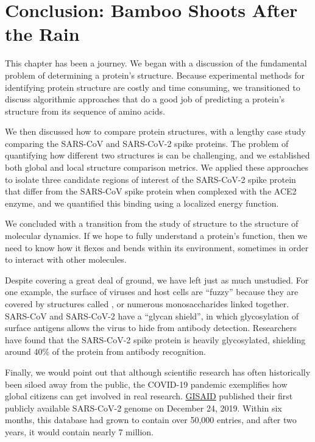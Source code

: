 \FloatBarrier
{}
\section{Conclusion: Bamboo Shoots After the Rain}

This chapter has been a journey. We began with a discussion of the fundamental problem of determining a protein's structure. Because experimental methods for identifying protein structure are costly and time consuming, we transitioned to discuss algorithmic approaches that do a good job of predicting a protein's structure from its sequence of amino acids.

We then discussed how to compare protein structures, with a lengthy case study comparing the SARS-CoV and SARS-CoV-2 spike proteins. The problem of quantifying how different two structures is can be challenging, and we established both global and local structure comparison metrics. We applied these approaches to isolate three candidate regions of interest of the SARS-CoV-2 spike protein that differ from the SARS-CoV spike protein when complexed with the ACE2 enzyme, and we quantified this binding using a localized energy function.

We concluded with a transition from the study of structure to the structure of molecular dynamics. If we hope to fully understand a protein's function, then we need to know how it flexes and bends within its environment, sometimes in order to interact with other molecules.

Despite covering a great deal of ground, we have left just as much unstudied. For one example, the surface of viruses and host cells are ``fuzzy'' because they are covered by structures called , or numerous monosaccharides linked together. SARS-CoV and SARS-CoV-2 have a “glycan shield”, in which glycosylation of surface antigens allows the virus to hide from antibody detection. Researchers have found that the SARS-CoV-2 spike protein is heavily glycosylated, shielding around 40\% of the protein from antibody recognition.

Finally, we would point out that although scientific research has often historically been siloed away from the public, the COVID-19 pandemic exemplifies how global citizens can get involved in real research. \href{https://www.gisaid.org}{GISAID} published their first publicly available SARS-CoV-2 genome on December 24, 2019. Within six months, this database had grown to contain over 50,000 entries, and after two years, it would contain nearly 7 million.

